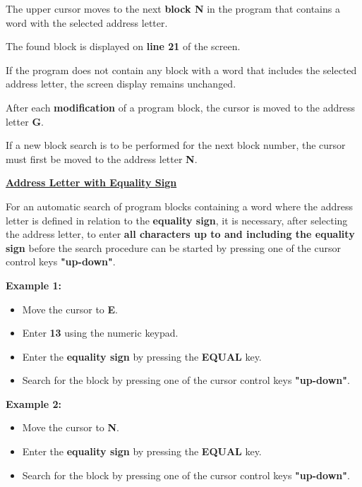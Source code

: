The upper cursor moves to the next \textbf{block N} in the program that contains a word with the selected address letter.

The found block is displayed on \textbf{line 21} of the screen.

If the program does not contain any block with a word that includes the selected address letter, the screen display remains unchanged.

\notes

After each \textbf{modification} of a program block, the cursor is moved to the address letter \textbf{G}.

If a new block search is to be performed for the next block number, the cursor must first be moved to the address letter \textbf{N}.

\newpage
\underline{\textbf{Address Letter with Equality Sign}}

For an automatic search of program blocks containing a word where the address letter is defined in relation to the \textbf{equality sign}, it is necessary, after selecting the address letter, to enter \textbf{all characters up to and including the equality sign} before the search procedure can be started by pressing one of the cursor control keys \textbf{"up-down"}.

\example

\begin{center}
    \textbf{Example 1:} 
\end{center}

\begin{itemize}
    \item Move the cursor to \textbf{E}.
    \item Enter \textbf{13} using the numeric keypad.
    \item Enter the \textbf{equality sign} by pressing the \textbf{EQUAL} key.
    \item Search for the block by pressing one of the cursor control keys \textbf{"up-down"}.
\end{itemize}

\begin{center}
    \textbf{Example 2:} 
\end{center}

\begin{itemize}
    \item Move the cursor to \textbf{N}.
    \item Enter the \textbf{equality sign} by pressing the \textbf{EQUAL} key.
    \item Search for the block by pressing one of the cursor control keys \textbf{"up-down"}.
\end{itemize}

